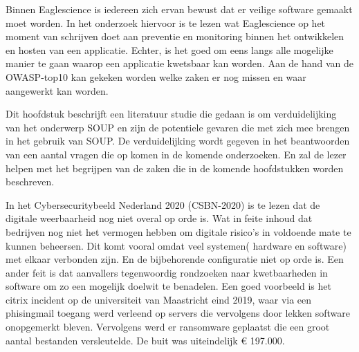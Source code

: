%
%
%

Binnen Eaglescience is iedereen zich ervan bewust dat er veilige software gemaakt moet worden. In het onderzoek hiervoor is te lezen wat Eaglescience op het moment van schrijven doet aan preventie en monitoring binnen het ontwikkelen en hosten van een applicatie. Echter, is het goed om eens langs alle mogelijke manier te gaan waarop een applicatie kwetsbaar kan worden. Aan de hand van de OWASP-top10 kan gekeken worden welke zaken er nog missen en waar aangewerkt kan worden.





Dit hoofdstuk beschrijft een literatuur studie die gedaan is om verduidelijking van het onderwerp SOUP en zijn de potentiele gevaren die met zich mee brengen in het gebruik van SOUP. De verduidelijking wordt gegeven in het beantwoorden van een aantal vragen die op komen in de komende onderzoeken.
En zal de lezer helpen met het begrijpen van de zaken die in de komende hoofdstukken worden beschreven.


In het Cybersecuritybeeld Nederland 2020 (CSBN-2020) is te lezen dat de digitale weerbaarheid nog niet overal op orde is.
Wat in feite inhoud dat bedrijven nog niet het vermogen hebben om digitale risico's in voldoende mate te kunnen beheersen.
Dit komt vooral omdat veel systemen( hardware en software) met elkaar verbonden zijn.
En de bijbehorende configuratie niet op orde is.
Een ander feit is dat aanvallers tegenwoordig rondzoeken naar kwetbaarheden in software om zo een mogelijk doelwit te benadelen.
Een goed voorbeeld is het citrix incident op de universiteit van Maastricht eind 2019, waar via een phisingmail toegang werd verleend op servers die vervolgens door lekken software onopgemerkt bleven.
Vervolgens werd er ransomware geplaatst die een groot aantal bestanden versleutelde.
De buit was uiteindelijk € 197.000.

